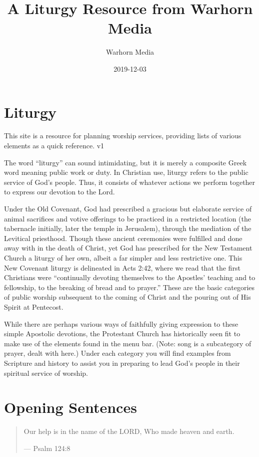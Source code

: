 \documentclass[]{book}
\title{A Liturgy Resource from Warhorn Media}
\author{Warhorn Media}
\date{2019-12-03}
\begin{document}
\maketitle

{
\setcounter{tocdepth}{1}
\tableofcontents
}
\chapter*{Liturgy}\label{liturgy}

This site is a resource for planning worship services, providing lists
of various elements as a quick reference. v1

The word ``liturgy'' can sound intimidating, but it is merely a
composite Greek word meaning public work or duty. In Christian use,
liturgy refers to the public service of God's people. Thus, it consists
of whatever actions we perform together to express our devotion to the
Lord.

Under the Old Covenant, God had prescribed a gracious but elaborate
service of animal sacrifices and votive offerings to be practiced in a
restricted location (the tabernacle initially, later the temple in
Jerusalem), through the mediation of the Levitical priesthood. Though
these ancient ceremonies were fulfilled and done away with in the death
of Christ, yet God has prescribed for the New Testament Church a liturgy
of her own, albeit a far simpler and less restrictive one. This New
Covenant liturgy is delineated in Acts 2:42, where we read that the
first Christians were ``continually devoting themselves to the Apostles'
teaching and to fellowship, to the breaking of bread and to prayer.''
These are the basic categories of public worship subsequent to the
coming of Christ and the pouring out of His Spirit at Pentecost.

While there are perhaps various ways of faithfully giving expression to
these simple Apostolic devotions, the Protestant Church has historically
seen fit to make use of the elements found in the menu bar. (Note: song
is a subcategory of prayer, dealt with here.) Under each category you
will find examples from Scripture and history to assist you in preparing
to lead God's people in their spiritual service of worship.

\chapter{Opening Sentences}\label{opening}

\begin{quote}
Our help is in the name of the LORD, Who made heaven and earth.

--- Psalm 124:8
\end{quote}
\end{document}
